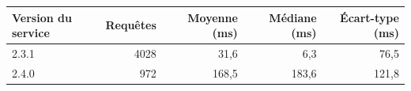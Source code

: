 \begin{tabular}{lrrrr}
\toprule
Version du service & Requêtes & Moyenne (ms) & Médiane (ms) & Écart-type (ms) \\
\midrule
2.3.1 & 4028 & 31,6 & 6,3 & 76,5 \\
2.4.0 & 972 & 168,5 & 183,6 & 121,8 \\
\bottomrule
\end{tabular}
